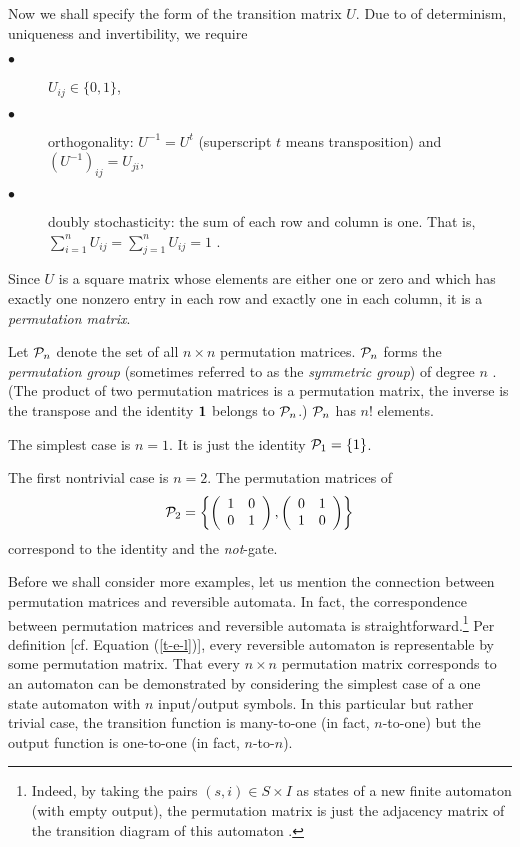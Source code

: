 Now we shall specify the form of the transition matrix $U$. Due to
of determinism, uniqueness and invertibility, we require
\begin{description}
\item[$\bullet$]
$U_{ij}\in \{0,1\}$,
\item[$\bullet$]
orthogonality:
 $U^{-1}=U^t$ (superscript $t$ means transposition) and
$(U^{-1})_{ij}=U_{ji}$,
\item[$\bullet$]
doubly stochasticity:
the sum of each row and column is one. That is,
$\sum_{i=1}^n U_{ij}= \sum_{j=1}^n U_{ij}=1$ \cite{lande73,peres,louck}.
\end{description}
Since $U$ is a square matrix whose elements are either one or zero and
which has exactly one nonzero entry in each row and exactly one in each
column, it is a {\em permutation matrix}.

Let ${\cal P}_n$ denote the set of all $n\times n$ permutation matrices.
 ${\cal P}_n$ forms the {\em permutation group} (sometimes referred to
as the
{\em symmetric group}) of degree $n$ \cite[chapter VII]{lomont}. (The
product of two permutation matrices is
a permutation matrix, the inverse is the transpose and the identity
${\bf
1}$ belongs to  ${\cal P}_n$.)
${\cal P}_n$ has $n!$ elements.


The simplest case is
$n=1$. It is just the identity ${\cal P}_1=\{1\}$.

The first nontrivial case
is $n=2$. The permutation matrices of $${\cal P}_2=\left\{
\left(
\begin{array}{cc}
1&0\\
0&1
\end{array}
\right)
,
\left(
\begin{array}{cc}
0&1\\
1&0
\end{array}
\right)
\right\}$$
correspond to the identity and the {\it not}-gate.

Before we shall consider more examples, let us mention the connection
between permutation matrices and reversible automata.
In fact, the correspondence between permutation matrices and
reversible automata is straightforward.\footnote{
Indeed, by taking the pairs $(s,i)\in S\times I$ as  states of a new
finite automaton (with empty output), the permutation matrix is just the
adjacency matrix of the transition diagram of this automaton
\cite{LindMarcus95,Eilenberg74,Biggs93}.}
Per definition
[cf. Equation
(\ref{t-e-l})], every reversible automaton is representable by some
permutation matrix. That every $n\times n$ permutation matrix
corresponds to an automaton can be demonstrated by
considering the simplest
case of a one state automaton with $n$ input/output symbols.
In this particular but rather trivial case, the transition function is
many-to-one (in fact, $n$-to-one) but the output function is one-to-one
(in fact, $n$-to-$n$).

